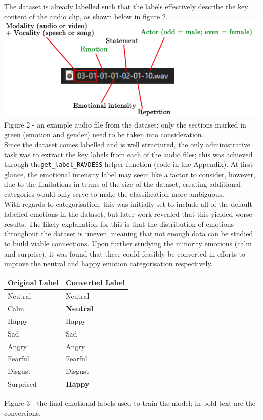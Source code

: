 \documentclass[12pt]{article}
\newcommand{\code}[1]{\colorbox{light-gray}{\texttt{#1}}}
\begin{document}
\noindent The dataset is already labelled such that the labels effectively describe the key content of the audio clip, as shown below in figure 2.
\\

\includegraphics{figure_2_dataset_audio_example}
Figure 2 - an example audio file from the dataset; only the sections marked in green (emotion and gender) need to be taken into consideration.
\\


\noindent Since the dataset comes labelled and is well structured, the only administrative task was to extract the key labels from each of the audio files; this was achieved through the\code{get\_label\_RAVDESS} helper function (code in the Appendix). At first glance, the emotional intensity label may seem like a factor to consider, however, due to the limitations in terms of the size of the dataset, creating additional categories would only serve to make the classification more ambiguous.
\\

\noindent With regards to categorisation, this was initially set to include all of the default labelled emotions in the dataset, but later work revealed that this yielded worse results. The likely explanation for this is that the distribution of emotions throughout the dataset is uneven, meaning that not enough data can be studied to build viable connections. Upon further studying the minority emotions (calm and surprise), it was found that these could feasibly be converted in efforts to improve the neutral and happy emotion categorisation respectively. 
\\
\begin{center}
\begin{tabularx}{\textwidth}{ |X|X| }
\hline 
  \textbf{Original Label}  & \textbf{Converted Label} \\
  \hline
  Neutral & Neutral \\
  \hline
  Calm & \textbf{Neutral} \\
  \hline
  Happy & Happy \\
  \hline
  Sad & Sad \\
  \hline
  Angry & Angry \\
  \hline
  Fearful & Fearful \\
  \hline
  Disgust & Disgust \\
  \hline
  Surprised & \textbf{Happy} \\
  \hline
\end{tabularx}
\end{center}
Figure 3 - the final emotional labels used to train the model; in bold text are the conversions.
\\
\end{document}
